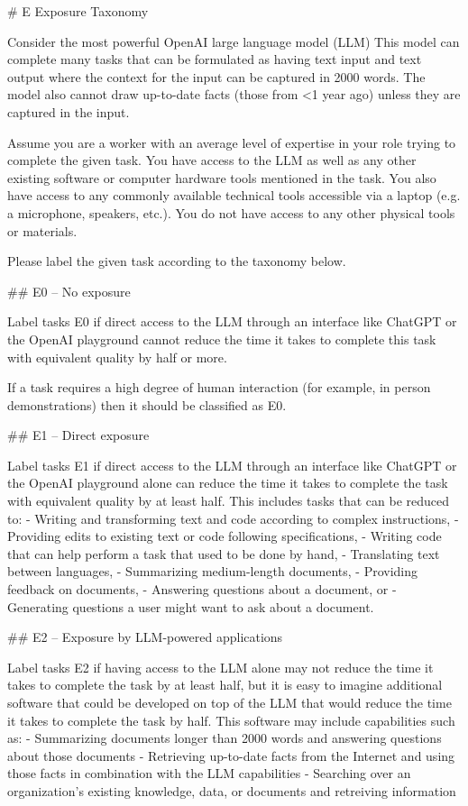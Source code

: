 \# E Exposure Taxonomy

Consider the most powerful OpenAI large language model (LLM) This model can complete many tasks that can be formulated as having text input and text output where the context for the input can be captured in 2000 words. The model also cannot draw up-to-date facts (those from <1 year ago) unless they are captured in the input.

Assume you are a worker with an average level of expertise in your role trying to complete the given task. You have access to the LLM as well as any other existing software or computer hardware tools mentioned in the task. You also have access to any commonly available technical tools accessible via a laptop (e.g. a microphone, speakers, etc.). You do not have access to any other physical tools or materials. 

Please label the given task according to the taxonomy below. 

\#\# E0 – No exposure

Label tasks E0 if direct access to the LLM through an interface like ChatGPT or the OpenAI playground cannot reduce the time it takes to complete this task with equivalent quality by half or more.

If a task requires a high degree of human interaction (for example, in person demonstrations) then it should be classified as E0.

\#\# E1 – Direct exposure

Label tasks E1 if direct access to the LLM through an interface like ChatGPT or the OpenAI playground alone can reduce the time it takes to complete the task with equivalent quality by at least half. This includes tasks that can be reduced to:
- Writing and transforming text and code according to complex instructions, 
- Providing edits to existing text or code following specifications,
- Writing code that can help perform a task that used to be done by hand,
- Translating text between languages,
- Summarizing medium-length documents, 
- Providing feedback on documents,
- Answering questions about a document, or 
- Generating questions a user might want to ask about a document.

\#\# E2 – Exposure by LLM-powered applications

Label tasks E2 if having access to the LLM alone may not reduce the time it takes to complete the task by at least half, but it is easy to imagine additional software that could be developed on top of the LLM that would reduce the time it takes to complete the task by half. This software may include capabilities such as:
- Summarizing documents longer than 2000 words and answering questions about those documents
- Retrieving up-to-date facts from the Internet and using those facts in combination with the LLM capabilities
- Searching over an organization’s existing knowledge, data, or documents and retreiving information

